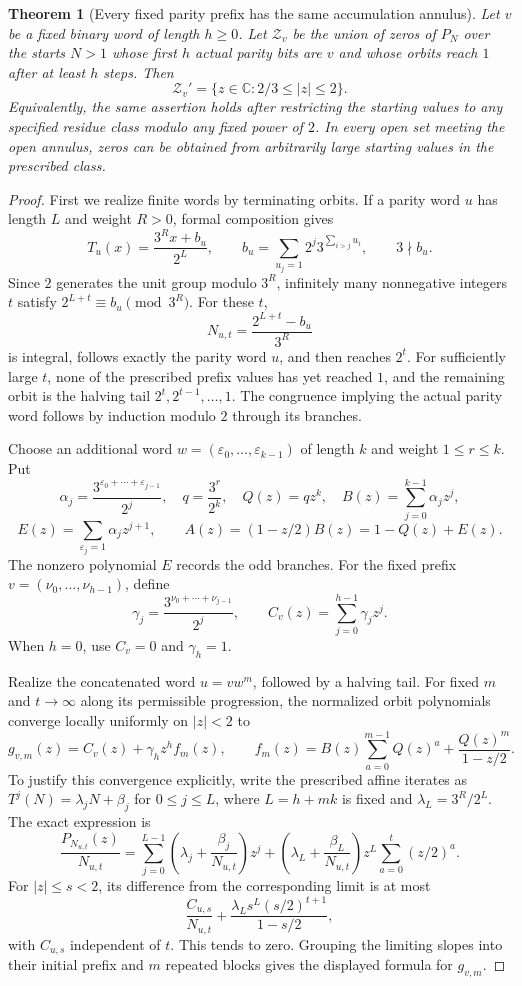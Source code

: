 \documentclass[11pt,a4paper]{article}
\newtheorem{theorem}{Theorem}[section]
\theoremstyle{definition}
\theoremstyle{remark}
\numberwithin{equation}{section}
\begin{document}
\begin{theorem}[Every fixed parity prefix has the same accumulation annulus]
\label{C:thm:prefix-annulus}
Let $v$ be a fixed binary word of length $h\ge0$. Let $\mathcal Z_v$
be the union of zeros of $P_N$ over the starts $N>1$ whose first $h$
actual parity bits are $v$ and whose orbits reach $1$ after at least $h$
steps. Then
\[
 \mathcal Z_v'=\{z\in\mathbb C:2/3\le|z|\le2\}.
\]
Equivalently, the same assertion holds after restricting the starting
values to any specified residue class modulo any fixed power of $2$.
In every open set meeting the open annulus, zeros can be obtained from
arbitrarily large starting values in the prescribed class.
\end{theorem}

\begin{proof}
First we realize finite words by terminating orbits. If a parity word $u$ has
length $L$ and weight $R>0$, formal composition gives
\[
 T_u(x)=\frac{3^Rx+b_u}{2^L},\qquad
 b_u=\sum_{u_j=1}2^j3^{\sum_{i>j}u_i},\qquad 3\nmid b_u.
\]
Since $2$ generates the unit group modulo $3^R$, infinitely many
nonnegative integers $t$ satisfy $2^{L+t}\equiv b_u\pmod{3^R}$.
For these $t$,
\[
 N_{u,t}=\frac{2^{L+t}-b_u}{3^R}
\]
is integral, follows exactly the parity word $u$, and then reaches
$2^t$. For sufficiently large $t$, none of the prescribed prefix
values has yet reached $1$, and the remaining orbit is the halving
tail $2^t,2^{t-1},\ldots,1$. The congruence implying the actual parity
word follows by induction modulo $2$ through its branches.

Choose an additional word $w=(\varepsilon_0,\ldots,\varepsilon_{k-1})$
of length $k$ and weight $1\le r\le k$. Put
\[
 \alpha_j=\frac{3^{\varepsilon_0+\cdots+\varepsilon_{j-1}}}{2^j},
 \quad q=\frac{3^r}{2^k},\quad Q(z)=qz^k,
 \quad B(z)=\sum_{j=0}^{k-1}\alpha_jz^j,
\]
\[
 E(z)=\sum_{\varepsilon_j=1}\alpha_jz^{j+1},
 \qquad A(z)=(1-z/2)B(z)=1-Q(z)+E(z).
\]
The nonzero polynomial $E$ records the odd branches. For the fixed
prefix $v=(\nu_0,\ldots,\nu_{h-1})$, define
\[
 \gamma_j=\frac{3^{\nu_0+\cdots+\nu_{j-1}}}{2^j},\qquad
 C_v(z)=\sum_{j=0}^{h-1}\gamma_jz^j.
\]
When $h=0$, use $C_v=0$ and $\gamma_h=1$.

Realize the concatenated word $u=vw^m$, followed by a halving tail.
For fixed $m$ and $t\to\infty$ along its permissible progression, the
normalized orbit polynomials converge locally uniformly on $|z|<2$ to
\[
 g_{v,m}(z)=C_v(z)+\gamma_hz^h f_m(z),\qquad
 f_m(z)=B(z)\sum_{a=0}^{m-1}Q(z)^a+
                  \frac{Q(z)^m}{1-z/2}.
\]
To justify this convergence explicitly, write the prescribed affine
iterates as $T^j(N)=\lambda_jN+\beta_j$ for $0\le j\le L$, where
$L=h+mk$ is fixed and $\lambda_L=3^R/2^L$. The exact expression is
\[
 \frac{P_{N_{u,t}}(z)}{N_{u,t}}
 =\sum_{j=0}^{L-1}\left(\lambda_j+
       \frac{\beta_j}{N_{u,t}}\right)z^j
 +\left(\lambda_L+\frac{\beta_L}{N_{u,t}}\right)
 z^L\sum_{a=0}^t(z/2)^a.
\]
For $|z|\le s<2$, its difference from the corresponding limit is at
most
\[
 \frac{C_{u,s}}{N_{u,t}}+
 \frac{\lambda_Ls^L(s/2)^{t+1}}{1-s/2},
\]
with $C_{u,s}$ independent of $t$. This tends to zero. Grouping the
limiting slopes into their initial prefix and $m$ repeated blocks gives
the displayed formula for $g_{v,m}$.


\end{proof}
\end{document}
